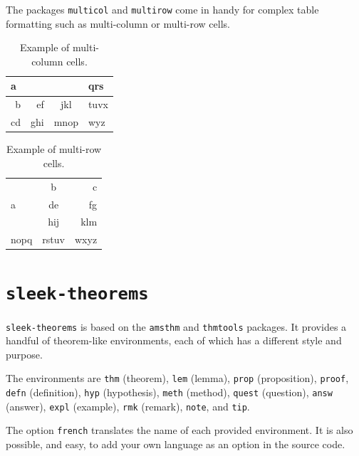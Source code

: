 \documentclass[a4paper, 12pt]{report}
\begin{document}
The packages \texttt{multicol} and \texttt{multirow} come in handy for complex table formatting such as multi-column or multi-row cells.

\begin{table}[H]
	\centering
	\begin{tabular}{|r|r|c|l|}
		\hline
		\multicolumn{3}{|l|}{a} & qrs  \\ \hline
		b &  ef &     jkl      & tuvx \\ \hline
		cd & ghi &     mnop     & wyz  \\ \hline
	\end{tabular}
	\caption{Example of multi-column cells.}
	\label{tab:multicol_example}
\end{table}

\begin{table}[H]
	\centering
	\begin{tabular}{|l|c|r|}
		\hline
		\multirow{3}{2cm}{a} &   b   &    c \\ \cline{2-3}
		&  de   &   fg \\ \cline{2-3}
		&  hij  &  klm \\ \hline
		nopq                 & rstuv & wxyz \\ \hline
	\end{tabular}
	\caption{Example of multi-row cells.}
	\label{tab:multirow_example}
\end{table}

\newpage
\section{\texttt{sleek-theorems}}

\texttt{sleek-theorems} is based on the \texttt{amsthm} and \texttt{thmtools} packages. It provides a handful of theorem-like environments, each of which has a different style and purpose.

The environments are \texttt{thm} (theorem), \texttt{lem} (lemma), \texttt{prop} (proposition), \texttt{proof}, \texttt{defn} (definition), \texttt{hyp} (hypothesis), \texttt{meth} (method), \texttt{quest} (question), \texttt{answ} (answer), \texttt{expl} (example), \texttt{rmk} (remark), \texttt{note}, and \texttt{tip}.

\begin{note}
	The option \texttt{french} translates the name of each provided environment. It is also possible, and easy, to add your own language as an option in the source code.
\end{note}
\end{document}
